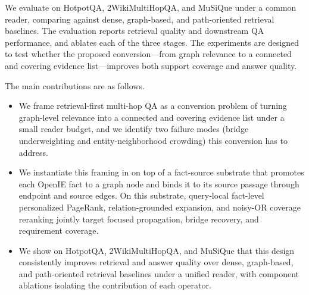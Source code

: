 We evaluate \methodname{} on HotpotQA, 2WikiMultiHopQA, and MuSiQue
under a common reader, comparing against dense, graph-based, and
path-oriented retrieval baselines. The evaluation reports retrieval
quality and downstream QA performance, and ablates each of the three
stages. The experiments are designed to test whether the proposed
conversion---from graph relevance to a connected and covering evidence
list---improves both support coverage and answer quality.

The main contributions are as follows.
\begin{itemize}
    \item We frame retrieval-first multi-hop QA as a conversion
    problem of turning graph-level relevance into a connected and
    covering evidence list under a small reader budget, and we
    identify two failure modes (bridge underweighting and
    entity-neighborhood crowding) this conversion has to address.
    \item We instantiate this framing in \methodname{} on top of a
    fact-source substrate that promotes each OpenIE fact to a graph
    node and binds it to its source passage through endpoint and
    source edges. On this substrate, query-local fact-level
    personalized PageRank, relation-grounded expansion, and
    noisy-OR coverage reranking jointly target focused propagation,
    bridge recovery, and requirement coverage.
    \item We show on HotpotQA, 2WikiMultiHopQA, and MuSiQue that
    this design consistently improves retrieval and answer quality
    over dense, graph-based, and path-oriented retrieval baselines
    under a unified reader, with component ablations isolating the
    contribution of each operator.
\end{itemize}
